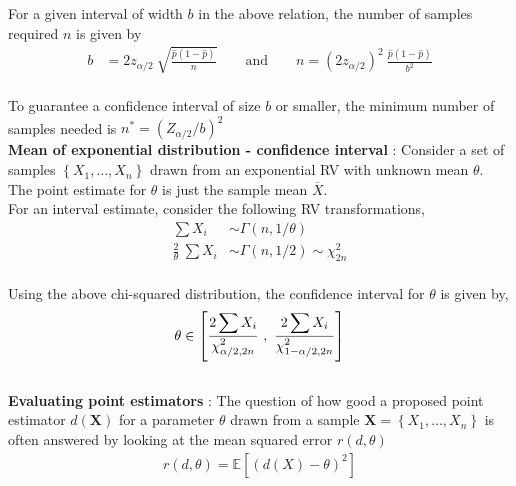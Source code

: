 For a given interval of width $ b $ in the above relation, the number of samples required $ n $ is given by \\

\begin{align}
	b &= 2 z_{\alpha/2}\ \sqrt{\frac{\widehat{p}(1-\widehat{p})}{n}} \qquad \text{and} \qquad n = (2z_{\alpha/2})^2\  \frac{\widehat{p}(1-\widehat{p})}{b^2}
\end{align}\\

To guarantee a confidence interval of size $ b $ or smaller, the minimum number of samples needed is $ n^* = (Z_{\alpha/2} / b)^2 $ \\

\textbf{Mean of exponential distribution - confidence interval} : Consider a set of samples $ \left\{X_1, \dots, X_n\right\} $ drawn from an exponential RV with unknown mean $ \theta $. The point estimate for $ \theta $ is just the sample mean $ \overline{X} $. \\

For an interval estimate, consider the following RV transformations, \\

\begin{align}
	\sum X_i &\sim \Gamma(n, 1/\theta) \nonumber \\
	\frac{2}{\theta}\ \sum X_i &\sim \Gamma(n, 1/2) \sim \chi^2_{2n}
\end{align} \\

Using the above chi-squared distribution, the confidence interval for $ \theta $ is given by, \\

\begin{align}
	\theta \in \left[\ddfrac{2 \sum X_i}{\chi^2_{\alpha/2, 2n}}\ ,\ \ddfrac{2 \sum X_i}{\chi^2_{1 - \alpha/2, 2n}}\right]
\end{align} \\

\textbf{Evaluating point estimators} : The question of how good a proposed point estimator $ d(\textbf{X}) $ for a parameter $ \theta $ drawn from a sample $ \textbf{X} = \left\{X_1, \dots, X_n\right\} $ is often answered by looking at the mean squared error $ r(d, \theta) $ \\

\begin{align}
	r(d, \theta) = \mathbb{E}[(d(X) - \theta)^2] 
\end{align}\\

